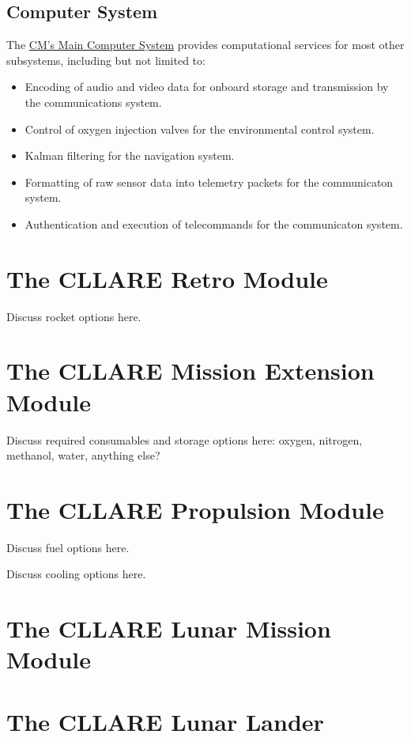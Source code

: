 \documentclass{report}
\begin{document}
\subsection{Computer System}

The \href{http://cstart.org/wiki/CLLARE_Main_Computer_System}{CM's Main Computer System} provides computational services for most other subsystems, including but not limited to:
\begin{itemize}
\item Encoding of audio and video data for onboard storage and transmission by the communications system.
\item Control of oxygen injection valves for the environmental control system.
\item Kalman filtering for the navigation system.
\item Formatting of raw sensor data into telemetry packets for the communicaton system.
\item Authentication and execution of telecommands for the communicaton system.
\end{itemize}

\section{The CLLARE Retro Module}

Discuss rocket options here.

\section{The CLLARE Mission Extension Module}

Discuss required consumables and storage options here: oxygen, nitrogen, methanol, water, anything else?

\section{The CLLARE Propulsion Module}

Discuss fuel options here.

Discuss cooling options here.

\section{The CLLARE Lunar Mission Module}

\section{The CLLARE Lunar Lander}
\end{document}
